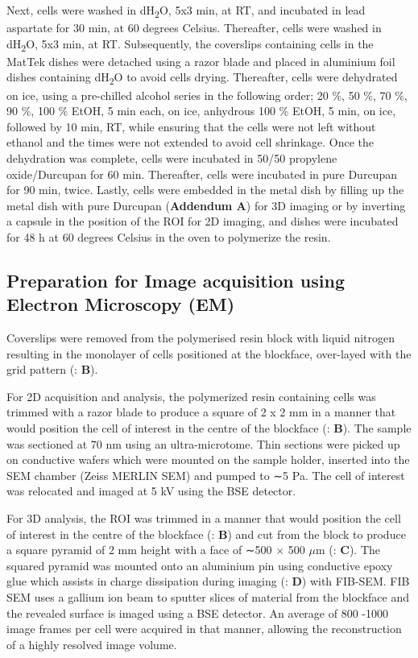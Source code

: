 Next, cells were washed in dH\textsubscript{2}O, 5x3 min, at RT, and incubated in lead aspartate for 30 min, at 60 degrees Celsius. Thereafter, cells were washed in dH\textsubscript{2}O, 5x3 min, at RT. Subsequently, the coverslips containing cells in the MatTek dishes were detached using a razor blade and placed in aluminium foil dishes containing dH\textsubscript{2}O to avoid cells drying. Thereafter,  cells were dehydrated on ice, using a pre-chilled alcohol series in the following order; 20 \%, 50 \%, 70 \%, 90 \%, 100 \% EtOH, 5 min each, on ice, anhydrous 100 \% EtOH, 5 min, on ice, followed by 10 min, RT, while ensuring that the cells were not left without ethanol and the times were not extended to avoid cell shrinkage. Once the dehydration was complete, cells were incubated in 50/50 propylene oxide/Durcupan for 60 min. Thereafter, cells were incubated in pure Durcupan for 90 min, twice. Lastly, cells were embedded in the metal dish by filling up the metal dish with pure Durcupan (\textbf{Addendum A}) for 3D imaging or by inverting a capsule in the position of the ROI for 2D imaging, and dishes were incubated for 48 h at 60 degrees Celsius in the oven to polymerize the resin.

\subsection{Preparation for Image acquisition using Electron Microscopy (EM)} 
Coverslips were removed from the polymerised resin block with liquid nitrogen resulting in the monolayer of cells positioned at the blockface, over-layed with the grid pattern (: \textbf{B}). 

For 2D acquisition and analysis, the polymerized resin containing cells was trimmed with a razor blade to produce a square of 2 x 2 mm in a manner that would position the cell of interest in the centre of the blockface (: \textbf{B}). The sample was sectioned at 70 nm using an ultra-microtome. Thin sections were picked up on conductive wafers which were mounted on the sample holder, inserted into the SEM chamber (Zeiss MERLIN SEM) and pumped to ∼5 Pa. The cell of interest was relocated and imaged at 5 kV using the BSE detector. 

For 3D analysis, the ROI was trimmed in a manner that would position the cell of interest in the centre of the blockface (: \textbf{B}) and cut from the block to produce a square pyramid of 2 mm height with a face of ∼500 × 500 $\mu$m (: \textbf{C}). The squared pyramid was mounted onto an aluminium pin using conductive epoxy glue which assists in charge dissipation during imaging (: \textbf{D}) with FIB-SEM. FIB SEM uses a gallium ion beam to sputter slices of material from the blockface and the revealed surface is imaged using a BSE detector. An average of 800 -1000 image frames per cell were acquired in that manner, allowing the reconstruction of a highly resolved image volume. 

